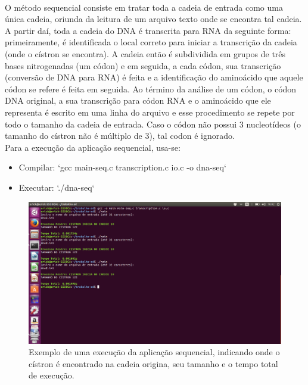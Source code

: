 \documentclass[a4paper,10pt]{article}
\begin{document}
\paragraph{}O método sequencial consiste em tratar toda a cadeia de entrada como uma única cadeia, oriunda da leitura de um arquivo texto onde se encontra tal cadeia. A partir daí, toda a cadeia do DNA é transcrita para RNA da seguinte forma: primeiramente, é identificada o local correto para iniciar a transcrição da cadeia (onde o cístron se encontra). A cadeia então é subdividida em grupos de três bases nitrogenadas (um códon) e em seguida, a cada códon, sua transcrição (conversão de DNA para RNA) é feita e a identificação do aminoácido que aquele códon se refere é feita em seguida. Ao término da análise de um códon, o códon DNA original, a sua transcrição para códon RNA e o aminoácido que ele representa é escrito em uma linha do arquivo e esse procedimento se repete por todo o tamanho da cadeia de entrada. Caso o códon não possui 3 nucleotídeos (o tamanho do cístron não é múltiplo de 3), tal codon é ignorado. \\

Para a execução da aplicação sequencial, usa-se:
\begin{center}\begin{itemize}\item{Compilar:} `gcc main-seq.c transcription.c io.c -o dna-seq`\\
    \item{Executar:} `./dna-seq` \end{itemize}\end{center}

\begin{figure}[!htb]
\includegraphics[scale=0.30]{execucao1.png}
\caption{Exemplo de uma execução da aplicação sequencial, indicando onde o cístron é encontrado na cadeia origina, seu tamanho e o tempo total de execução.}
\label{seq}
\end{figure}
\newpage
\end{document}
